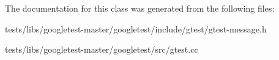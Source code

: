 The documentation for this class was generated from the following files\+:\begin{DoxyCompactItemize}
\item 
tests/libs/googletest-\/master/googletest/include/gtest/gtest-\/message.\+h\item 
tests/libs/googletest-\/master/googletest/src/gtest.\+cc\end{DoxyCompactItemize}
